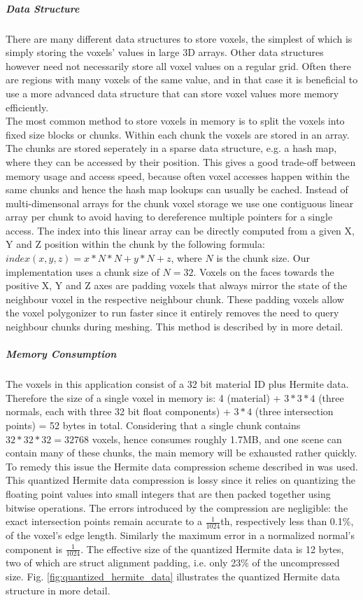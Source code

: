 \subparagraph{Data Structure}

There are many different data structures to store voxels, the simplest of which is simply storing the voxels' values in large 3D arrays.
Other data structures however need not necessarily store all voxel values on a regular grid. Often there are regions with many voxels of the same value, and
in that case it is beneficial to use a more advanced data structure that can store voxel values more memory efficiently.\\
The most common method to store voxels in memory is to split the voxels into fixed size blocks or chunks. Within each chunk the voxels are stored in an array. The chunks are stored seperately in a sparse data structure, e.g. a hash map,
where they can be accessed by their position. This gives a good trade-off between memory usage and access speed, because often voxel accesses happen within the same chunks and hence the hash map lookups can usually be cached. Instead of multi-dimensonal arrays for the chunk voxel storage we use one contiguous linear array per chunk to avoid having to dereference multiple pointers for a single access. The index into this linear array can be directly computed from a given X, Y and Z position within the chunk by the following formula: $index(x, y, z) = x * N * N + y * N + z$, where $N$ is the chunk size.
Our implementation uses a chunk size of $N=32$. Voxels on the faces towards the positive X, Y and Z axes are padding voxels that always mirror the state of the neighbour voxel in the respective neighbour chunk.
These padding voxels allow the voxel polygonizer to run faster since it entirely removes the need to query neighbour chunks during meshing. This method is described by \cite{voxel_acceleration} in more detail.

\subparagraph{Memory Consumption}

The voxels in this application consist of a 32 bit material ID plus Hermite data. Therefore the size of a single voxel in memory is: 4 (material) + $3*3*4$ (three normals, each with three 32 bit float components) + $3*4$ (three intersection points) = 52 bytes in total. Considering that a single chunk contains $32 * 32 * 32 = 32768$ voxels, hence consumes roughly 1.7MB, and one scene can contain many of these chunks,
the main memory will be exhausted rather quickly.
To remedy this issue the Hermite data compression scheme described in \cite{quantized_hermite_data} was used.
This quantized Hermite data compression is lossy since it relies on quantizing the floating point values into small integers that are then packed together using bitwise operations. The errors introduced by the compression are
negligible: the exact intersection points remain accurate to a $\frac{1}{1024}$th, respectively less than 0.1\%, of the voxel's edge length. Similarly the maximum error in a normalized normal's component is $\frac{1}{1024}$.
The effective size of the quantized Hermite data is 12 bytes, two of which are struct alignment padding, i.e. only 23\% of the uncompressed size. Fig. \ref{fig:quantized_hermite_data} illustrates the quantized Hermite data
structure in more detail.

